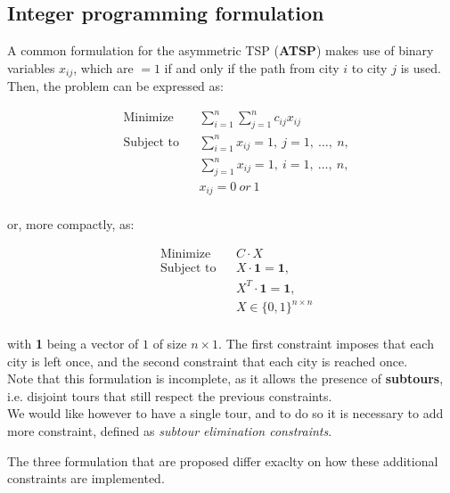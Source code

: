 \documentclass[
12pt,
a4paper,
oneside,
headinclude,
footinclude]{article}
\begin{document}
    \subsection{Integer programming formulation}
    A common formulation for the asymmetric TSP (\textbf{ATSP}) makes use of binary variables $x_{ij}$, which are $=1$ if and only if the path from city $i$ to city $j$ is used. Then, the problem can be expressed as:
    
    \begin{equation*}
    \begin{aligned}
    & {\text{Minimize}}
    & & \sum_{i=1}^n{\sum_{j=1}^n{c_{ij}x_{ij}}} \\
    & \text{Subject to}
    & & \sum_{i=1}^n{x_{ij}=1},\ j = 1,\ \ldots,\ n, \\
    & & & \sum_{j=1}^n{x_{ij}=1},\ i = 1,\ \ldots,\ n, \\
    &  && x_{ij} =0\ or\ 1 \\
    \end{aligned}
    \end{equation*}
    
    or, more compactly, as:
    
    \begin{equation*}
    \begin{aligned}
    & {\text{Minimize}}
    & & C \cdot X \\
    & \text{Subject to}
    & & X \cdot \mathbf{1} = \mathbf{1},\ \\
    & & & X^T \cdot \mathbf{1} = \mathbf{1},\ \\
    &  && X \in \{0, 1\}^{n \times n} \\
    \end{aligned}
    \end{equation*}
    
    with \textbf{1} being a vector of $1$ of size $n \times 1$.
    The first constraint imposes that each city is left once, and the second constraint that each city is reached once.\\
    Note that this formulation is incomplete, as it allows the presence of \textbf{subtours}, i.e. disjoint tours that still respect the previous constraints. \\
    We would like however to have a single tour, and to do so it is necessary to add more constraint, defined as \textit{subtour elimination constraints}.
    
    The three formulation that are proposed differ exaclty on how these additional constraints are implemented.
    
\end{document}
